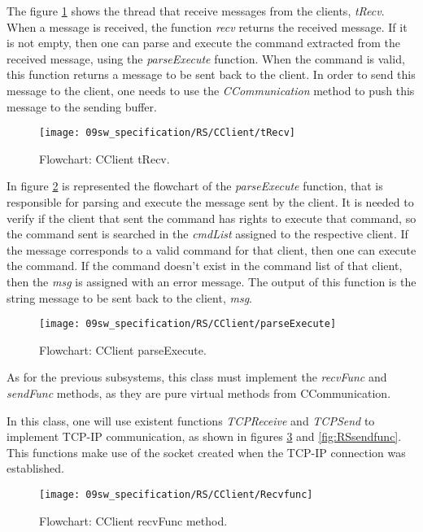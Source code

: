 The figure \ref{fig:RSRecv} shows the thread that receive messages from the clients, \textit{tRecv}. When a message is received, the function \textit{recv} returns the received message. If it is not empty, then one can parse and execute the command extracted from the received message, using the \textit{parseExecute} function. When the command is valid, this function returns a message to be sent back to the client. In order to send this message to the client, one needs to use the \textit{CCommunication} method to push this message to the sending buffer.

\begin{figure}[H]
	\centering
	\texttt{[image: 09sw\_specification/RS/CClient/tRecv]}
	\caption{Flowchart: CClient tRecv.}
	\label{fig:RSRecv}
\end{figure}

In figure \ref{fig:parseExecute} is represented the flowchart of the \textit{parseExecute} function, that is responsible for parsing and execute the message sent by the client. It is needed to verify if the client that sent the command has rights to execute that command, so the command sent is searched in the \textit{cmdList} assigned to the respective client. If the message corresponds to a valid command for that client, then one can execute the command. If the command doesn't exist in the command list of that client, then the \textit{msg} is assigned with an error message. The output of this function is the string message to be sent back to the client, \textit{msg}.

\begin{figure}[H]
	\centering
	\texttt{[image: 09sw\_specification/RS/CClient/parseExecute]}
	\caption{Flowchart: CClient parseExecute.}
	\label{fig:parseExecute}
\end{figure}

As for the previous subsystems, this class must implement the \textit{recvFunc} and \textit{sendFunc} methods, as they are pure virtual methods from CCommunication. 

In this class, one will use existent functions \textit{TCPReceive} and \textit{TCPSend} to implement TCP-IP communication, as shown in figures \ref{fig:RSrecvfunc} and \ref{fig:RSsendfunc}. This functions make use of the socket created when the TCP-IP connection was established.

\begin{figure}[H]
	\centering
	\texttt{[image: 09sw\_specification/RS/CClient/Recvfunc]}
	\caption{Flowchart: CClient recvFunc method.}
	\label{fig:RSrecvfunc}
\end{figure}

